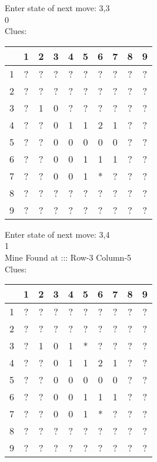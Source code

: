 Enter state of next move: 3,3\\
0\\
Clues:\\
\begin{tabular}{|c|c|c|c|c|c|c|c|c|c|}
\hline
  & 1 & 2 & 3 & 4 & 5 & 6 & 7 & 8 & 9\\
\hline
1 & ? & ? & ? & ? & ? & ? & ? & ? & ?\\
\hline
2 & ? & ? & ? & ? & ? & ? & ? & ? & ?\\
\hline
3 & ? & 1 & 0 & ? & ? & ? & ? & ? & ?\\
\hline
4 & ? & ? & 0 & 1 & 1 & 2 & 1 & ? & ?\\
\hline
5 & ? & ? & 0 & 0 & 0 & 0 & 0 & ? & ?\\
\hline
6 & ? & ? & 0 & 0 & 1 & 1 & 1 & ? & ?\\
\hline
7 & ? & ? & 0 & 0 & 1 & * & ? & ? & ?\\
\hline
8 & ? & ? & ? & ? & ? & ? & ? & ? & ?\\
\hline
9 & ? & ? & ? & ? & ? & ? & ? & ? & ?\\
\hline
\end{tabular}

Enter state of next move: 3,4\\
1\\
Mine Found at ::: Row-3 Column-5\\
Clues:\\
\begin{tabular}{|c|c|c|c|c|c|c|c|c|c|}
\hline
  & 1 & 2 & 3 & 4 & 5 & 6 & 7 & 8 & 9\\
\hline
1 & ? & ? & ? & ? & ? & ? & ? & ? & ?\\
\hline
2 & ? & ? & ? & ? & ? & ? & ? & ? & ?\\
\hline
3 & ? & 1 & 0 & 1 & * & ? & ? & ? & ?\\
\hline
4 & ? & ? & 0 & 1 & 1 & 2 & 1 & ? & ?\\
\hline
5 & ? & ? & 0 & 0 & 0 & 0 & 0 & ? & ?\\
\hline
6 & ? & ? & 0 & 0 & 1 & 1 & 1 & ? & ?\\
\hline
7 & ? & ? & 0 & 0 & 1 & * & ? & ? & ?\\
\hline
8 & ? & ? & ? & ? & ? & ? & ? & ? & ?\\
\hline
9 & ? & ? & ? & ? & ? & ? & ? & ? & ?\\
\hline
\end{tabular}

